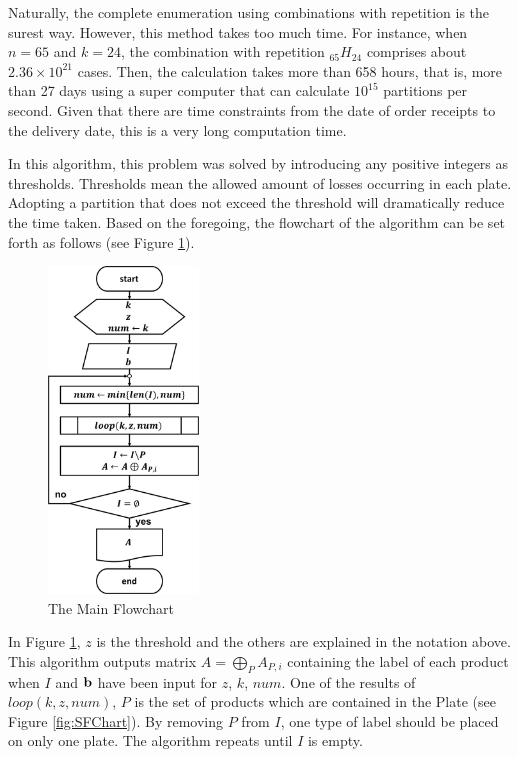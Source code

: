 \documentclass[a4paper]{amsart}
\numberwithin{equation}{section} %
\numberwithin{figure}{section} %
\numberwithin{table}{section}
\theoremstyle{plain}
\theoremstyle{definition}
\theoremstyle{plain}
\theoremstyle{plain}
\theoremstyle{plain}
\theoremstyle{plain}
\theoremstyle{plain}
\begin{document}
Naturally, the complete enumeration using combinations with repetition is the surest way. 
However, this method takes too much time. 
For instance, when $n=65$ and $k = 24$, the combination with repetition $_{65}H_{24}$ comprises about $2.36 \times 10^{21}$ cases.
Then, the calculation takes more than 658 hours, that is, more than 27 days using a super computer that can calculate $10^{15}$ partitions per second. 
Given that there are time constraints from the date of order receipts to the delivery date, this is a very long computation time.

In this algorithm, this problem was solved by introducing any positive integers as thresholds. 
Thresholds mean the allowed amount of losses occurring in each plate. 
Adopting a partition that does not exceed the threshold will dramatically reduce the time taken.
Based on the foregoing, the flowchart of the algorithm can be set forth as follows (see Figure \ref{fig:MFChart}).

\begin{figure}[h!]
	\centering
	\includegraphics[width=4cm]{MainFChart.pdf}
	\caption{The Main Flowchart}
	\label{fig:MFChart}       %
\end{figure}

In Figure \ref{fig:MFChart}, $z$ is the threshold and the others are explained in the notation above.
This algorithm outputs matrix $A=\bigoplus\limits_{P} A_{P,i}$ containing the label of each product when $I$ and ${\bf b}$ have been input for $z$, $k$, $num$. 
One of the results of ${loop}(k, z, num)$, $P$ is the set of products which are contained in the Plate (see Figure \ref{fig:SFChart}). 
By removing $P$ from $I$, one type of label should be placed on only one plate.
The algorithm repeats until $I$ is empty.
\end{document}
